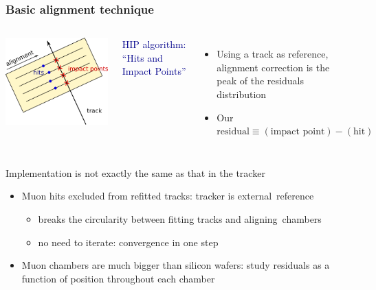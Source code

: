 \documentclass[compress]{beamer}
\begin{document}
\begin{frame}
\frametitle{Basic alignment technique}
\begin{columns}
\includegraphics[width=\linewidth]{hip_explanation.png}


\textcolor{darkblue}{HIP algorithm: ``Hits and Impact Points''}
\begin{itemize}
\item Using a track as reference, alignment correction is the peak of the residuals distribution

\item Our $\mbox{residual} \equiv \left(\mbox{impact point}\right) - \left(\mbox{hit}\right)$

\end{itemize}
\end{columns}

\vfill
Implementation is not exactly the same as that in the tracker

\begin{itemize}
\item Muon hits excluded from refitted tracks: tracker is \mbox{external reference\hspace{-1 cm}}
\begin{itemize}
\item breaks the circularity between fitting tracks and \mbox{aligning chambers\hspace{-1 cm}}
\item no need to iterate: convergence in one step
\end{itemize}
\item Muon chambers are much bigger than silicon wafers: study
  residuals as a function of position throughout each chamber
\end{itemize}
\end{frame}
\end{document}
